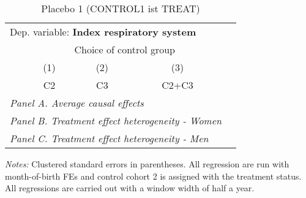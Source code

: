  \begin{table}[H] \centering \begin{threeparttable} \caption{Placebo 1 (CONTROL1 ist TREAT) } {\def\sym#1{\ifmmode^{#1}\else\(^{#1}\)\fi} \begin{tabular}{l*{4}{c}} \toprule \multicolumn{4}{l}{Dep. variable: \textbf{Index respiratory system}} \\ & \multicolumn{3}{c}{Choice of control group} \\ \cmidrule(lr){2-4}
            &\multicolumn{1}{c}{(1)}&\multicolumn{1}{c}{(2)}&\multicolumn{1}{c}{(3)}\\
            &\multicolumn{1}{c}{C2}&\multicolumn{1}{c}{C3}&\multicolumn{1}{c}{C2+C3}\\
\midrule
 \multicolumn{4}{l}{\emph{Panel A. Average causal effects}} \\      \midrule\multicolumn{4}{l}{\emph{Panel B. Treatment effect heterogeneity - Women}} \\      \midrule\multicolumn{4}{l}{\emph{Panel C. Treatment effect heterogeneity - Men}} \\      
\bottomrule \end{tabular} } \begin{tablenotes} \item \scriptsize \emph{Notes:} Clustered standard errors in parentheses. All regression are run with month-of-birth FEs and control cohort 2 is assigned with the treatment status. All regressions are carried out with a window width of half a year. \end{tablenotes} \end{threeparttable} \end{table} 
